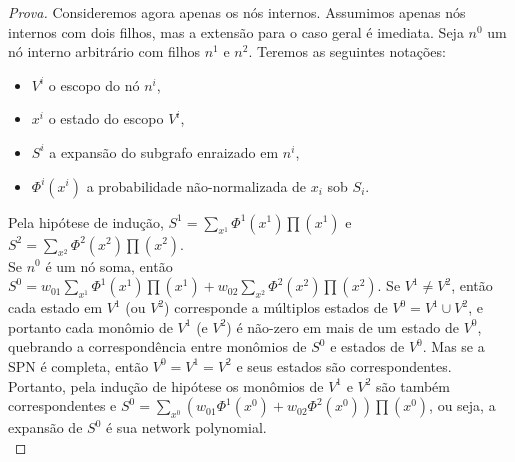 \documentclass[a4paper,10pt]{article}
\theoremstyle{plain}
\begin{document}
\begin{proof}[Prova]
  Consideremos agora apenas os nós internos. Assumimos apenas nós internos com dois filhos, mas a
  extensão para o caso geral é imediata. Seja $n^0$ um nó interno arbitrário com filhos $n^1$ e
  $n^2$. Teremos as seguintes notações:

  \begin{itemize}
    \item $V^i$ o escopo do nó $n^i$,
    \item $x^i$ o estado do escopo $V^i$,
    \item $S^i$ a expansão do subgrafo enraizado em $n^i$,
    \item $\Phi^i(x^i)$ a probabilidade não-normalizada de $x_i$ sob $S_i$.
  \end{itemize}

  Pela hipótese de indução, $S^1=\sum_{x^1}\Phi^1(x^1)\prod(x^1)$ e  $S^2=\sum_{x^2}\Phi^2(x^2)
  \prod(x^2)$.\\

  Se $n^0$ é um nó soma, então $S^0=w_{01}\sum_{x^1}\Phi^1(x^1)\prod(x^1)+w_{02}\sum_{x^2}\Phi^2
  (x^2)\prod(x^2)$. Se $V^1 \neq V^2$, então cada estado em $V^1$ (ou $V^2$) corresponde a múltiplos
  estados de $V^0 = V^1 \cup V^2$, e portanto cada monômio de $V^1$ (e $V^2$) é não-zero em mais de
  um estado de $V^0$, quebrando a correspondência entre monômios de $S^0$ e estados de $V^0$. Mas
  se a SPN é completa, então $V^0 = V^1 = V^2$ e seus estados são correspondentes. Portanto, pela
  indução de hipótese os monômios de $V^1$ e $V^2$ são também correspondentes e $S^0=\sum_{x^0}
  (w_{01}\Phi^1(x^0)+w_{02}\Phi^2(x^0))\prod(x^0)$, ou seja, a expansão de $S^0$ é sua network
  polynomial.\\


\end{proof}
\end{document}
